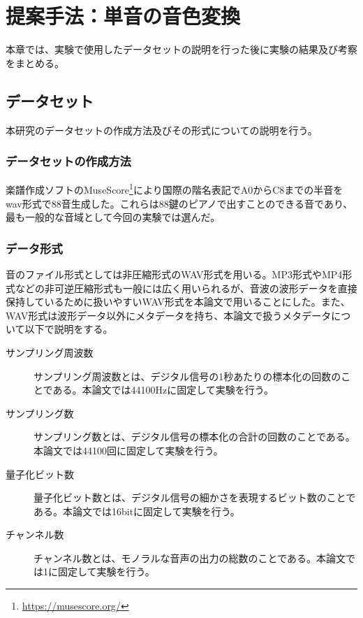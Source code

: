 \chapter{提案手法：単音の音色変換}

本章では、実験で使用したデータセットの説明を行った後に実験の結果及び考察をまとめる。

\section{データセット}

本研究のデータセットの作成方法及びその形式についての説明を行う。

\subsection{データセットの作成方法}

楽譜作成ソフトのMuseScore\footnote{\url{https://musescore.org/}}により国際の階名表記でA0からC8までの半音をwav形式で88音生成した。これらは88鍵のピアノで出すことのできる音であり、最も一般的な音域として今回の実験では選んだ。

\subsection{データ形式}

音のファイル形式としては非圧縮形式のWAV形式を用いる。MP3形式やMP4形式などの非可逆圧縮形式も一般には広く用いられるが、音波の波形データを直接保持しているために扱いやすいWAV形式を本論文で用いることにした。また、WAV形式は波形データ以外にメタデータを持ち、本論文で扱うメタデータについて以下で説明をする。

\begin{description}

\item[サンプリング周波数]\mbox{}

サンプリング周波数とは、デジタル信号の1秒あたりの標本化の回数のことである。本論文では44100Hzに固定して実験を行う。

\item[サンプリング数]\mbox{}

サンプリング数とは、デジタル信号の標本化の合計の回数のことである。本論文では44100回に固定して実験を行う。

\item[量子化ビット数]\mbox{}

量子化ビット数とは、デジタル信号の細かさを表現するビット数のことである。本論文では16bitに固定して実験を行う。

\item[チャンネル数]\mbox{}

チャンネル数とは、モノラルな音声の出力の総数のことである。本論文では1に固定して実験を行う。

\end{description}

